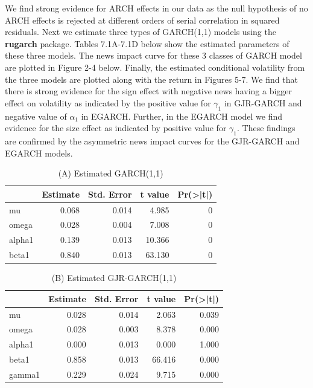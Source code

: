 \documentclass[]{book}
\theoremstyle{definition}
\theoremstyle{definition}
\theoremstyle{definition}
\theoremstyle{remark}
\begin{document}
We find strong evidence for ARCH effects in our data as the null hypothesis of no ARCH effects is rejected at different orders of serial correlation in squared residuals. Next we estimate three types of GARCH(1,1) models using the \textbf{rugarch} package. Tables 7.1A-7.1D below show the estimated parameters of these three models. The news impact curve for these 3 classes of GARCH model are plotted in Figure 2-4 below. Finally, the estimated conditional volatility from the three models are plotted along with the return in Figures 5-7. We find that there is strong evidence for the sign effect with negative news having a bigger effect on volatility as indicated by the positive value for \(\gamma_1\) in GJR-GARCH and negative value of \(\alpha_1\) in EGARCH. Further, in the EGARCH model we find evidence for the size effect as indicated by positive value for \(\gamma_1\). These findings are confirmed by the asymmetric news impact curves for the GJR-GARCH and EGARCH models.

\begin{table}[t]

\caption{\label{tab:unnamed-chunk-14}(A) Estimated GARCH(1,1)}
\centering
\begin{tabular}{l|r|r|r|r}
\hline
  &  Estimate &  Std. Error &  t value & Pr(>|t|)\\
\hline
mu & 0.068 & 0.014 & 4.985 & 0\\
\hline
omega & 0.028 & 0.004 & 7.008 & 0\\
\hline
alpha1 & 0.139 & 0.013 & 10.366 & 0\\
\hline
beta1 & 0.840 & 0.013 & 63.130 & 0\\
\hline
\end{tabular}
\end{table}

\begin{table}[t]

\caption{\label{tab:unnamed-chunk-14}(B) Estimated GJR-GARCH(1,1)}
\centering
\begin{tabular}{l|r|r|r|r}
\hline
  &  Estimate &  Std. Error &  t value & Pr(>|t|)\\
\hline
mu & 0.028 & 0.014 & 2.063 & 0.039\\
\hline
omega & 0.028 & 0.003 & 8.378 & 0.000\\
\hline
alpha1 & 0.000 & 0.013 & 0.000 & 1.000\\
\hline
beta1 & 0.858 & 0.013 & 66.416 & 0.000\\
\hline
gamma1 & 0.229 & 0.024 & 9.715 & 0.000\\
\hline
\end{tabular}
\end{table}
\end{document}
